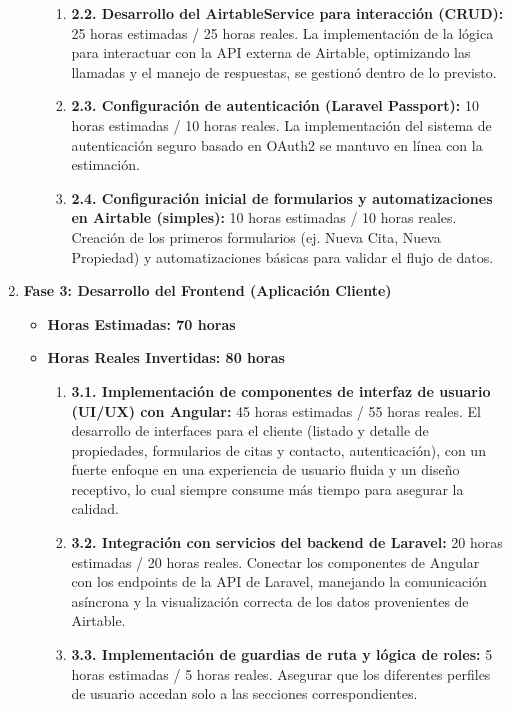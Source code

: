\begin{enumerate}
\begin{itemize}
\begin{enumerate}
            \item \textbf{2.2. Desarrollo del AirtableService para interacción (CRUD):} 25 horas estimadas / 25 horas reales. La implementación de la lógica para interactuar con la API externa de Airtable, optimizando las llamadas y el manejo de respuestas, se gestionó dentro de lo previsto.
            \item \textbf{2.3. Configuración de autenticación (Laravel Passport):} 10 horas estimadas / 10 horas reales. La implementación del sistema de autenticación seguro basado en OAuth2 se mantuvo en línea con la estimación.
            \item \textbf{2.4. Configuración inicial de formularios y automatizaciones en Airtable (simples):} 10 horas estimadas / 10 horas reales. Creación de los primeros formularios (ej. Nueva Cita, Nueva Propiedad) y automatizaciones básicas para validar el flujo de datos.
        \end{enumerate}
    \end{itemize}
    \item \textbf{Fase 3: Desarrollo del Frontend (Aplicación Cliente)}
    \begin{itemize}
        \item \textbf{Horas Estimadas: 70 horas}
        \item \textbf{Horas Reales Invertidas: 80 horas}
        \begin{enumerate}
            \item \textbf{3.1. Implementación de componentes de interfaz de usuario (UI/UX) con Angular:} 45 horas estimadas / 55 horas reales. El desarrollo de interfaces para el cliente (listado y detalle de propiedades, formularios de citas y contacto, autenticación), con un fuerte enfoque en una experiencia de usuario fluida y un diseño receptivo, lo cual siempre consume más tiempo para asegurar la calidad.
            \item \textbf{3.2. Integración con servicios del backend de Laravel:} 20 horas estimadas / 20 horas reales. Conectar los componentes de Angular con los endpoints de la API de Laravel, manejando la comunicación asíncrona y la visualización correcta de los datos provenientes de Airtable.
            \item \textbf{3.3. Implementación de guardias de ruta y lógica de roles:} 5 horas estimadas / 5 horas reales. Asegurar que los diferentes perfiles de usuario accedan solo a las secciones correspondientes.
        \end{enumerate}
    \end{itemize}

\end{enumerate}
